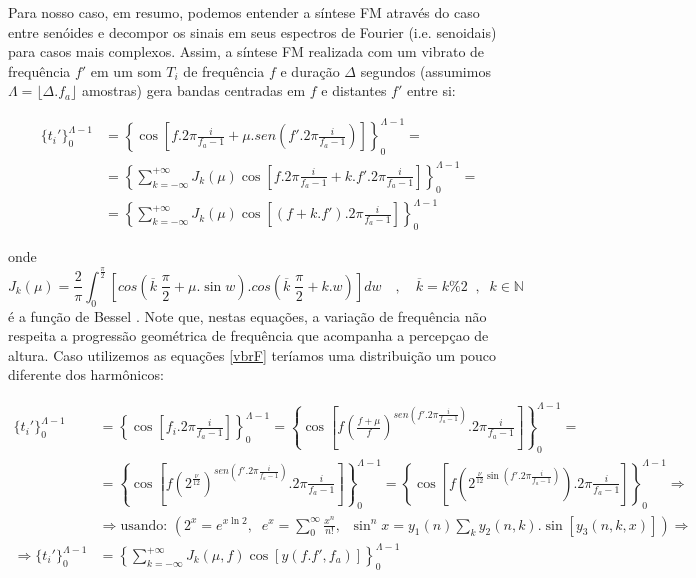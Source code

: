 Para nosso caso, em resumo, podemos entender a síntese FM através do caso entre senóides
e decompor os sinais em seus espectros de Fourier (i.e. senoidais) para casos mais complexos.
Assim, a síntese FM realizada com um vibrato de frequência $f'$ em um som $T_i$ de frequência $f$
e duração $\Delta$ segundos (assumimos $\Lambda = \lfloor \Delta . f_a \rfloor $ amostras)
gera bandas centradas em $f$ e distantes $f'$ entre si:

\begin{equation}
\begin{split}
\{t_i'\}_0^{\Lambda -1} & = \left \{ \cos \left [f . 2 \pi \frac{i}{f_a-1} + \mu . sen \left ( f' . 2 \pi \frac{i}{ f_a -1 } \right ) \right ] \right \}_0^{\Lambda-1}  = \\
 & = \left \{ \sum_{k=-\infty}^{+\infty} J_k(\mu) \cos \left [ f . 2 \pi \frac{i}{f_a-1} + k . f' . 2 \pi \frac{i}{f_a-1} \right ]  \right \}_0^{\Lambda-1} = \\
 & = \left \{ \sum_{k=-\infty}^{+\infty} J_k(\mu) \cos \left [ (f+k.f') . 2 \pi \frac{i}{f_a-1} \right ]  \right \}_0^{\Lambda-1}
\end{split}
\end{equation}

onde 
\begin{equation}
J_k(\mu) = \frac{2}{\pi} \int_0^{\frac{\pi}{2}}\left [ cos \left (\overline{k}\;\frac{\pi}{2} + \mu . \sin w \right ) . cos \left ( \overline{k}\;\frac{\pi}{2} + k . w \right ) \right ] dw \quad , \quad \overline{k} = k \% 2 \;\;,\;\; k \in \mathbb{N}
\end{equation}
é a função de Bessel \cite{BesselCCRMA,JOSFM}. Note que, nestas equações, a variação de frequência não respeita a progressão geométrica de frequência que acompanha a percepçao de altura. Caso utilizemos as equações \ref{vbrF} teríamos uma distribuição um pouco diferente dos harmônicos:


\begin{equation}
\begin{split}
\{t_i'\}_0^{\Lambda -1} &  = \left \{ \cos \left [f_i . 2 \pi \frac{i}{f_a-1} \right ] \right \}_0^{\Lambda-1}  = \left \{ \cos \left [f\left ( \frac{f+\mu}{f} \right )^{sen \left ( f' . 2 \pi \frac{i}{ f_a -1 } \right )} . 2 \pi \frac{i}{f_a-1} \right ] \right \}_0^{\Lambda-1}  =  \\
 & = \left \{ \cos \left [f\left ( 2^{\frac{\nu}{12}} \right )^{sen \left ( f' . 2 \pi \frac{i}{ f_a -1 } \right )} . 2 \pi \frac{i}{f_a-1} \right ] \right \}_0^{\Lambda-1} =\left \{ \cos \left [f\left ( 2^{\frac{\nu}{12} \sin \left ( f' . 2 \pi \frac{i}{ f_a -1 } \right )  } \right ) . 2 \pi \frac{i}{f_a-1} \right ] \right \}_0^{\Lambda-1} \Rightarrow \\
& \Rightarrow \text{usando: } \left ( 2^x=e^{x \ln 2}, \;\; e^x=\sum_0^\infty \frac{x^n}{n!},\;\; \sin^nx=y_1(n)\sum_k y_2(n,k).\sin[y_3(n,k,x)]   \right ) \Rightarrow \\
\Rightarrow \{t_i'\}_0^{\Lambda -1} & = \left \{ \sum_{k=-\infty}^{+\infty} J_k(\mu,f) \cos \left [ y(f.f', f_a) \right ]  \right \}_0^{\Lambda-1}
\end{split}
\end{equation}

